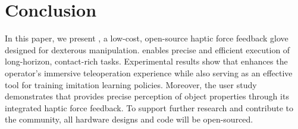 \section{Conclusion} 
\label{sec:conclusion}
In this paper, we present \oursystem, a low-cost, open-source haptic force feedback glove designed for dexterous manipulation. \oursystem enables precise and efficient execution of long-horizon, contact-rich tasks. Experimental results show that \oursystem enhances the operator's immersive teleoperation experience while also serving as an effective tool for training imitation learning policies. Moreover, the user study demonstrates that \oursystem provides precise perception of object properties through its integrated haptic force feedback. To support further research and contribute to the community, all hardware designs and code will be open-sourced.